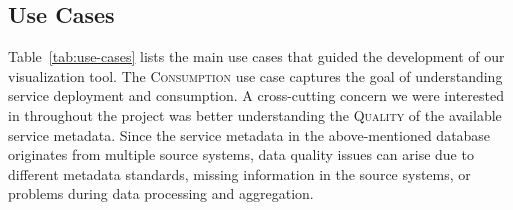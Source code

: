 \documentclass[conference]{IEEEtran}
\begin{document}

\subsection{Use Cases}
\label{sec:use-cases}

Table~\ref{tab:use-cases} lists the main use cases that guided the development of our visualization tool.
The \textsc{Consumption} use case captures the goal of understanding service deployment and consumption.
A cross-cutting concern we were interested in throughout the project was better understanding the \textsc{Quality} of the available service metadata.
Since the service metadata in the above-mentioned database originates from multiple source systems, data quality issues can arise due to different metadata standards, missing information in the source systems, or problems during data processing and aggregation.
\end{document}

